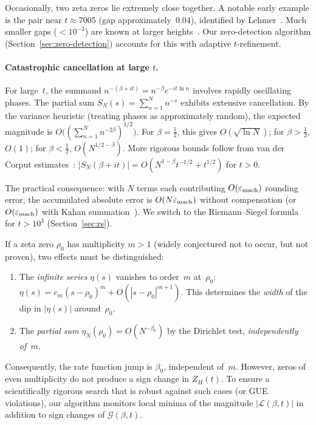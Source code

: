 \begin{remark}\label{rem:lehmer}
Occasionally, two zeta zeros lie extremely close together. A notable early example is
the pair near $t \approx 7005$ (gap approximately~0.04), identified by
Lehmer~\cite{lehmer1956}. Much smaller gaps ($< 10^{-3}$) are known at larger
heights~\cite{odlyzko1989}. Our zero-detection algorithm (Section~\ref{sec:zero-detection})
accounts for this with adaptive $t$-refinement.
\end{remark}

\paragraph{Catastrophic cancellation at large $t$.}
For large~$t$, the summand $n^{-(\beta+it)} = n^{-\beta}e^{-it\ln n}$ involves rapidly
oscillating phases. The partial sum $S_N(s) = \sum_{n=1}^{N} n^{-s}$ exhibits extensive
cancellation. By the variance heuristic (treating phases as approximately random), the
expected magnitude is $O\bigl((\sum_{n=1}^{N} n^{-2\beta})^{1/2}\bigr)$. For
$\beta = \tfrac{1}{2}$, this gives $O(\sqrt{\ln N})$; for $\beta > \tfrac{1}{2}$,
$O(1)$; for $\beta < \tfrac{1}{2}$, $O(N^{1/2-\beta})$. More rigorous bounds follow
from van der Corput estimates~\cite{titchmarsh1986}:
$|S_N(\beta+it)| = O(N^{1-\beta}t^{-1/2} + t^{1/2})$ for $t > 0$.

The practical consequence: with $N$ terms each contributing $O(\varepsilon_{\mathrm{mach}})$
rounding error, the accumulated absolute error is $O(N\varepsilon_{\mathrm{mach}})$ without
compensation (or $O(\varepsilon_{\mathrm{mach}})$ with Kahan summation~\cite{kahan1965}). We
switch to the Riemann--Siegel formula for $t > 10^3$
(Section~\ref{sec:rs}).

\begin{remark}\label{rem:mult}
If a zeta zero $\rho_0$ has multiplicity $m > 1$ (widely conjectured not to occur, but
not proven), two effects must be distinguished:
\begin{enumerate}
  \item[(i)] The \emph{infinite series} $\eta(s)$ vanishes to order~$m$ at~$\rho_0$:
    $\eta(s) = c_m(s-\rho_0)^m + O(|s-\rho_0|^{m+1})$. This determines the \emph{width} of the dip in
    $|\eta(s)|$ around~$\rho_0$.
  \item[(ii)] The \emph{partial sum} $\eta_N(\rho_0) = O(N^{-\beta_0})$ by the Dirichlet
    test, \emph{independently of~$m$}.
\end{enumerate}
Consequently, the rate function jump is $\beta_0$, independent of~$m$. However, zeros 
of even multiplicity do not produce a sign change in $Z_H(t)$. To ensure a 
scientifically rigorous search that is robust against such cases (or GUE violations), 
our algorithm monitors local minima of the magnitude $|\mathcal{L}(\beta, t)|$ in 
addition to sign changes of $\mathcal{G}(\beta, t)$.
\end{remark}

